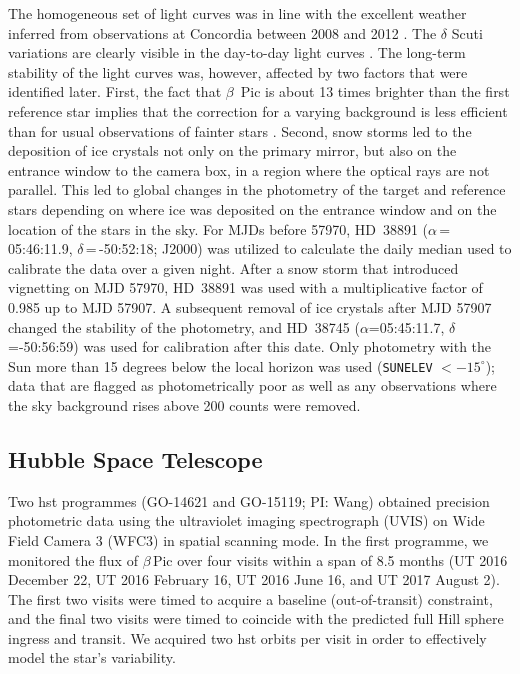 \documentclass[longauth]{aa} %
\newcommand{\bp}{$\beta$\,Pic}
\begin{document}
The homogeneous set of light curves was in line with the excellent weather inferred from observations at Concordia between 2008 and 2012 \citep{Crouzet18}.
%
The $\delta$ Scuti variations are clearly visible in the day-to-day light curves \citep[][]{Mekarnia2017}.
%
The long-term stability of the light curves was, however, affected by two factors that were identified later.
%
First, the fact that $\beta$~Pic is about 13 times brighter than the first reference star implies that the correction for a varying background is less efficient than for usual observations of fainter stars \citep[e.g.][]{Mekarnia16}.
%
Second, snow storms led to the deposition of ice crystals not only on the primary mirror, but also on the entrance window to the camera box, in a region where the optical rays are not parallel.
%
This led to global changes in the photometry of the target and reference stars depending on where ice was deposited on the entrance window and on the location of the stars in the sky.
%
For MJDs before 57970, HD~38891 ($\alpha$\,=\,05:46:11.9, $\delta$\,=\,-50:52:18; J2000) was utilized to calculate the daily median used to calibrate the data over a given night.
%
After a snow storm that introduced vignetting on MJD 57970, HD~38891 was used with a multiplicative factor of 0.985 up to MJD 57907.
%
A subsequent removal of ice crystals after MJD 57907 changed the stability of the photometry, and HD~38745 ($\alpha$=05:45:11.7, $\delta$=-50:56:59)
 was used for calibration after this date.
%
Only photometry with the Sun more than 15 degrees below the local horizon was used ({\tt SUNELEV} $<-15^{\circ}$); data that are flagged as photometrically poor as well as any observations where the sky background rises above 200 counts were removed.


\subsection{Hubble Space Telescope}

Two \ac{hst} programmes (GO-14621 and GO-15119; PI: Wang) obtained precision photometric data using the ultraviolet imaging spectrograph (UVIS) on Wide Field Camera 3 (WFC3) in spatial scanning mode.
%
In the first programme, we monitored the flux of \bp{} over four visits within a span of 8.5 months (UT 2016 December 22, UT 2016 February 16, UT 2016 June 16, and UT 2017 August 2).
%
The first two visits were timed to acquire a baseline (out-of-transit) constraint, and the final two visits were timed to coincide with the predicted full Hill sphere ingress and transit.
%
We acquired two \ac{hst} orbits per visit in order to effectively model the star's variability.
\end{document}
